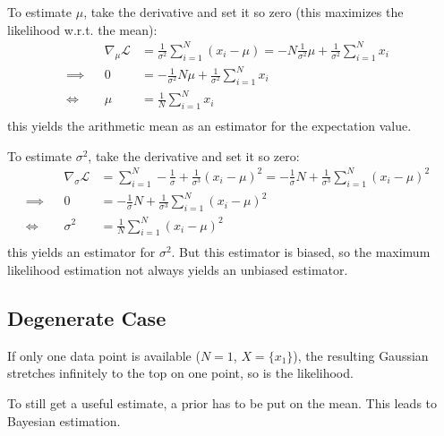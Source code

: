 				To estimate \(\mu\), take the derivative and set it so zero (this maximizes the likelihood w.r.t. the mean):
				\begin{align}
					         &  & \nabla_\mu \mathcal{L} & = \frac{1}{\sigma^2} \sum_{i = 1}^{N} (x_i - \mu) = -N\frac{1}{\sigma^2}\mu + \frac{1}{\sigma^2} \sum_{i = 1}^{N} x_i & \\
					\implies &  & 0                      & = -\frac{1}{\sigma^2}N\mu + \frac{1}{\sigma^2} \sum_{i = 1}^{N} x_i                                                   & \\
					\iff     &  & \mu                    & = \frac{1}{N} \sum_{i = 1}^{N} x_i                                                                                    & \\
				\end{align}
				this yields the arithmetic mean as an estimator for the expectation value.

				To estimate \(\sigma^2\), take the derivative and set it so zero:
				\begin{align}
					         &  & \nabla_{\sigma} \mathcal{L} & = \sum_{i = 1}^{N} -\frac{1}{\sigma} + \frac{1}{\sigma^3} (x_i - \mu)^2 = -\frac{1}{\sigma}N + \frac{1}{\sigma^3} \sum_{i = 1}^{N} (x_i - \mu)^2 & \\
					\implies &  & 0                           & = -\frac{1}{\sigma}N + \frac{1}{\sigma^3} \sum_{i = 1}^{N} (x_i - \mu)^2                                                                         & \\
					\iff     &  & \sigma^2                    & = \frac{1}{N} \sum_{i = 1}^{N} (x_i - \mu)^2                                                                                                     & \\
				\end{align}
				this yields an estimator for \(\sigma^2\). But this estimator is biased, so the maximum likelihood estimation not always yields an unbiased estimator.

		\subsection{Degenerate Case}
			If only one data point is available (\( N = 1 \), \( X = \{ x_1 \} \)), the resulting Gaussian stretches infinitely to the top on one point, so is the likelihood.

			To still get a useful estimate, a prior has to be put on the mean. This leads to Bayesian estimation.

